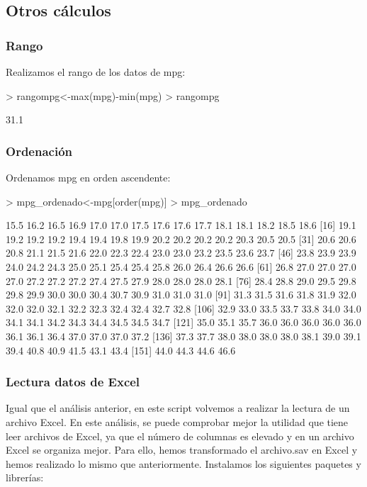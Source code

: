 \documentclass [a4paper] {article}
\begin{document}
\subsection{Otros cálculos}

\subsubsection{Rango}
Realizamos el rango de los datos de mpg:

\begin{Schunk}
\begin{Sinput}
> rangompg<-max(mpg)-min(mpg)
> rangompg
\end{Sinput}
\begin{Soutput}
[1] 31.1
\end{Soutput}
\end{Schunk}


\subsubsection{Ordenación}
Ordenamos mpg en orden ascendente:

\begin{Schunk}
\begin{Sinput}
> mpg_ordenado<-mpg[order(mpg)]
> mpg_ordenado
\end{Sinput}
\begin{Soutput}
  [1] 15.5 16.2 16.5 16.9 17.0 17.0 17.5 17.6 17.6 17.7 18.1 18.1 18.2 18.5 18.6
 [16] 19.1 19.2 19.2 19.2 19.4 19.4 19.8 19.9 20.2 20.2 20.2 20.2 20.3 20.5 20.5
 [31] 20.6 20.6 20.8 21.1 21.5 21.6 22.0 22.3 22.4 23.0 23.0 23.2 23.5 23.6 23.7
 [46] 23.8 23.9 23.9 24.0 24.2 24.3 25.0 25.1 25.4 25.4 25.8 26.0 26.4 26.6 26.6
 [61] 26.8 27.0 27.0 27.0 27.0 27.2 27.2 27.2 27.4 27.5 27.9 28.0 28.0 28.0 28.1
 [76] 28.4 28.8 29.0 29.5 29.8 29.8 29.9 30.0 30.0 30.4 30.7 30.9 31.0 31.0 31.0
 [91] 31.3 31.5 31.6 31.8 31.9 32.0 32.0 32.0 32.1 32.2 32.3 32.4 32.4 32.7 32.8
[106] 32.9 33.0 33.5 33.7 33.8 34.0 34.0 34.1 34.1 34.2 34.3 34.4 34.5 34.5 34.7
[121] 35.0 35.1 35.7 36.0 36.0 36.0 36.0 36.0 36.1 36.1 36.4 37.0 37.0 37.0 37.2
[136] 37.3 37.7 38.0 38.0 38.0 38.0 38.1 39.0 39.1 39.4 40.8 40.9 41.5 43.1 43.4
[151] 44.0 44.3 44.6 46.6
\end{Soutput}
\end{Schunk}


\subsubsection{Lectura datos de Excel}
Igual que el análisis anterior, en este script volvemos a realizar la lectura de un archivo Excel.
En este análisis, se puede comprobar mejor la utilidad que tiene leer archivos de Excel, ya que
el número de columnas es elevado y en un archivo Excel se organiza mejor. Para ello, hemos transformado
el archivo.sav en Excel y hemos realizado lo mismo que anteriormente. Instalamos los siguientes paquetes
y librerías:
\end{document}
